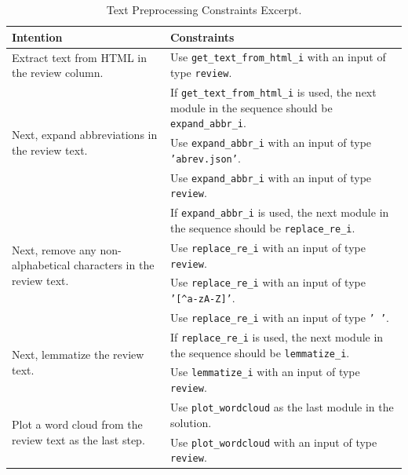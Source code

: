 \begin{table}[h]
\centering
\footnotesize
\begin{tabular}{|p{}|p{}|}
\hline
\textbf{Intention} & \textbf{Constraints} \\
\hline
Extract text from HTML in the review column. & Use \texttt{get\_text\_from\_html\_i} with an input of type \texttt{review}. \\
\hline
\multirow{3}{=}{Next, expand abbreviations in the review text.} & If \texttt{get\_text\_from\_html\_i} is used, the next module in the sequence should be \texttt{expand\_abbr\_i}. \\
\cline{2-2}
& Use \texttt{expand\_abbr\_i} with an input of type \texttt{'abrev.json'}. \\
\cline{2-2}
& Use \texttt{expand\_abbr\_i} with an input of type \texttt{review}. \\
\hline
\multirow{4}{=}{Next, remove any non-alphabetical characters in the review text.} & If \texttt{expand\_abbr\_i} is used, the next module in the sequence should be \texttt{replace\_re\_i}. \\
\cline{2-2}
& Use \texttt{replace\_re\_i} with an input of type \texttt{review}. \\
\cline{2-2}
& Use \texttt{replace\_re\_i} with an input of type \texttt{'[\textasciicircum a-zA-Z]'}. \\
\cline{2-2}
& Use \texttt{replace\_re\_i} with an input of type \texttt{' '}. \\
\hline
\multirow{2}{=}{Next, lemmatize the review text.} & If \texttt{replace\_re\_i} is used, the next module in the sequence should be \texttt{lemmatize\_i}. \\
\cline{2-2}
& Use \texttt{lemmatize\_i} with an input of type \texttt{review}. \\
\hline
\multirow{2}{=}{Plot a word cloud from the review text as the last step.} & Use \texttt{plot\_wordcloud} as the last module in the solution. \\
\cline{2-2}
& Use \texttt{plot\_wordcloud} with an input of type \texttt{review}. \\
\hline
\end{tabular}
\caption{Text Preprocessing Constraints Excerpt.}
\label{table:native_ape_text_processing_constraints}
\end{table}

